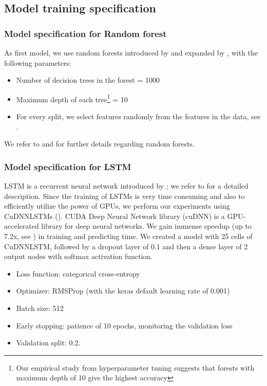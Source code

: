 \documentclass[review]{elsarticle}
\begin{document}
\subsection{Model training specification}
\subsubsection{Model specification for Random forest}
As first model, we use random forests introduced by \cite{ho1995random} and expanded by \cite{breiman2001random},
with the following parameters: \begin{itemize}
	\item Number of decision trees in the forest = 1000 
	
	\item Maximum depth of each tree\footnote{Our empirical study from hyperparameter tuning suggests that forests with maximum depth of 10 give the highest accuracy} = 10


	\item For every split, we select  features randomly from the  features in the data, see \cite{pedregosa2011scikit}. 
	
\end{itemize}
We refer to \cite[Subsubsection~4.3.3]{krauss17} and \cite[Section~3.4]{krauss18} for further details regarding random forests.
\subsubsection{Model specification for LSTM} LSTM is a recurrent neural network introduced by \cite{schmidhuber1997long}; we refer to \cite{krauss18} for a detailed description. Since  the training of LSTMs is very time consuming and also to efficiently utilize the power of GPUs, we perform our experiments using CuDNNLSTMs (\cite{chetlur2014cudnn}). CUDA Deep Neural Network library (cuDNN) is a GPU-accelerated library for deep neural networks. We gain immense speedup (up to 7.2x, see \cite{braun2018lstm}) in training and predicting time. We created a model with 25 cells of CuDNNLSTM, followed by a dropout layer of 0.1 and then a dense layer of 2 output nodes with softmax activation function. 

\begin{itemize}
    \item Loss function: categorical cross-entropy
    \item Optimizer: RMSProp (with the keras default learning rate of 0.001)
    \item Batch size: 512
    \item Early stopping: patience of 10 epochs, monitoring the validation loss
    \item Validation split: 0.2.
\end{itemize}
\end{document}
